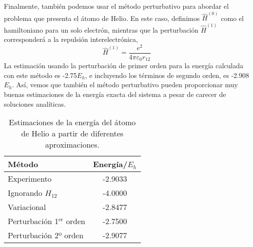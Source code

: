 Finalmente, también podemos usar el método perturbativo para
abordar el problema que presenta el átomo de Helio. En este caso, 
definimos $\hat{H}^{(0)}$ como el hamiltoniano para un solo electrón, 
mientras que la perturbación $\hat{H}^{(1)}$ corresponderá a la
repulsión interelectrónica, 
\begin{equation}
\hat{H}^{(1)}=\frac{e^2}{4\pi \varepsilon_0r_{12}}
\end{equation}
La estimación usando la perturbación de primer orden para la energía
calculada con este método es -2.75$E_h$, e incluyendo los 
términos de segundo orden, es -2.908$E_h$. Así, vemos que también 
el método perturbativo pueden proporcionar 
muy buenas estimaciones de la energía exacta del sistema a pesar
de carecer de soluciones analíticas.

\begin{table}[]
    \centering
    \begin{tabular}{ | l | c |}
    \hline
        \textbf{Método} & \textbf{Energía/$E_h$} \\
         \hline
         Experimento &  -2.9033 \\
         Ignorando $H_{12}$ & -4.0000 \\
         Variacional & -2.8477 \\
         Perturbación 1$^\mathrm{er}$ orden & -2.7500 \\
         Perturbación 2º orden & -2.9077 \\
     \hline    
    \end{tabular}
    \caption{Estimaciones de la energía del átomo de 
    Helio a partir de  diferentes aproximaciones.}
    \label{tab:my_label}
\end{table}